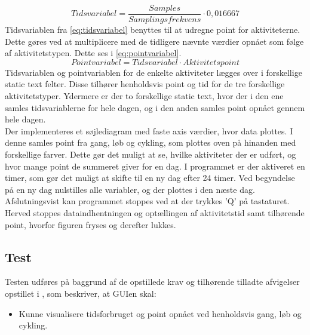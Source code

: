 \begin{equation}
Tidsvariabel = \frac{Samples}{Samplingsfrekvens} \cdot 0,016667
\label{eq:tidsvariabel}
\end{equation}
Tidsvariablen fra \eqref{eq:tidsvariabel} benyttes til at udregne point for aktiviteterne. Dette gøres ved at multiplicere med de tidligere nævnte værdier opnået som følge af aktivitetstypen. Dette ses i \eqref{eq:pointvariabel}. 
\begin{equation}
Pointvariabel = Tidsvariabel \cdot Aktivitetspoint
\label{eq:pointvariabel}
\end{equation}
Tidsvariablen og pointvariablen for de enkelte aktiviteter lægges over i forskellige static text felter. Disse tilhører henholdsvis point og tid for de tre forskellige aktivitetstyper. Ydermere er der to forskellige static text, hvor der i den ene samles tidsvariablerne for hele dagen, og i den anden samles point opnået gennem hele dagen. \\
Der implementeres et søjlediagram med faste axis værdier, hvor data plottes. I denne samles point fra gang, løb og cykling, som plottes oven på hinanden med forskellige farver. Dette gør det muligt at se, hvilke aktiviteter der er udført, og hvor mange point de summeret giver for en dag. I programmet er der aktiveret en timer, som gør det muligt at skifte til en ny dag efter 24 timer. Ved begyndelse på en ny dag nulstilles alle variabler, og der plottes i den næste dag.\\ 
Afslutningsvist kan programmet stoppes ved at der trykkes 'Q' på tastaturet. Herved stoppes dataindhentningen og optællingen af aktivitetstid samt tilhørende point, hvorfor figuren fryses og derefter lukkes. 

\subsection{Test}
Testen udføres på baggrund af de opstillede krav og tilhørende tilladte afvigelser opstillet i , som beskriver, at GUIen skal:
\begin{itemize}
	\item Kunne visualisere tidsforbruget og point opnået ved henholdsvis gang, løb og cykling.  
\end{itemize}

